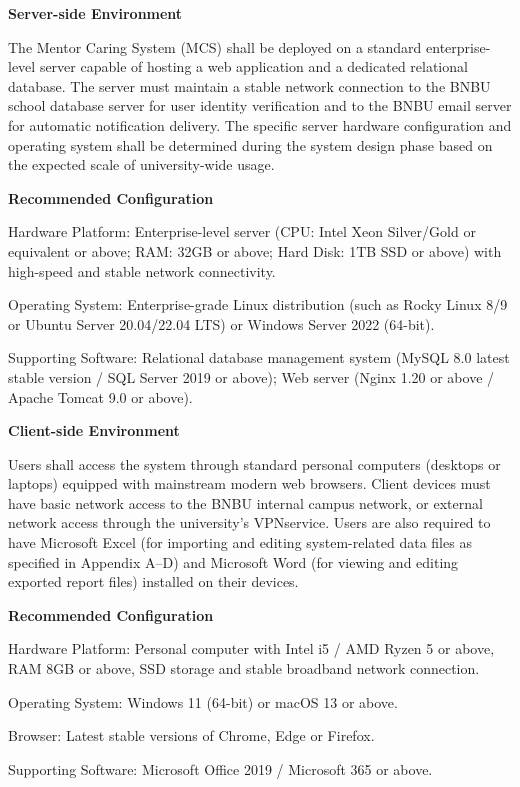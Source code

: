 \documentclass[a4paper,12pt]{article}
\begin{document}
\textbf{Server-side Environment}

The Mentor Caring System (MCS) shall be deployed on a standard enterprise-level server capable of hosting a web application and a dedicated relational database. The server must maintain a stable network connection to the BNBU school database server for user identity verification and to the BNBU email server for automatic notification delivery. The specific server hardware configuration and operating system shall be determined during the system design phase based on the expected scale of university-wide usage.

\textbf{Recommended Configuration}

Hardware Platform: Enterprise-level server (CPU: Intel Xeon Silver/Gold or equivalent or above; RAM: 32GB or above; Hard Disk: 1TB SSD or above) with high-speed and stable network connectivity.

Operating System: Enterprise-grade Linux distribution (such as Rocky Linux 8/9 or Ubuntu Server 20.04/22.04 LTS) or Windows Server 2022 (64-bit).

Supporting Software: Relational database management system (MySQL 8.0 latest stable version / SQL Server 2019 or above); Web server (Nginx 1.20 or above / Apache Tomcat 9.0 or above).

\textbf{Client-side Environment}

\begin{sloppypar}
Users shall access the system through standard personal computers (desktops or laptops) equipped with mainstream modern web browsers. Client devices must have basic network access to the BNBU internal campus network, or external network access through the university's VPN\@ service. Users are also required to have Microsoft Excel (for importing and editing system-related data files as specified in Appendix A--D) and Microsoft Word (for viewing and editing exported report files) installed on their devices.
\end{sloppypar}

\textbf{Recommended Configuration}

Hardware Platform: Personal computer with Intel i5 / AMD Ryzen 5 or above, RAM 8GB or above, SSD storage and stable broadband network connection.

Operating System: Windows 11 (64-bit) or macOS 13 or above.

Browser: Latest stable versions of Chrome, Edge or Firefox.

Supporting Software: Microsoft Office 2019 / Microsoft 365 or above.
\end{document}

